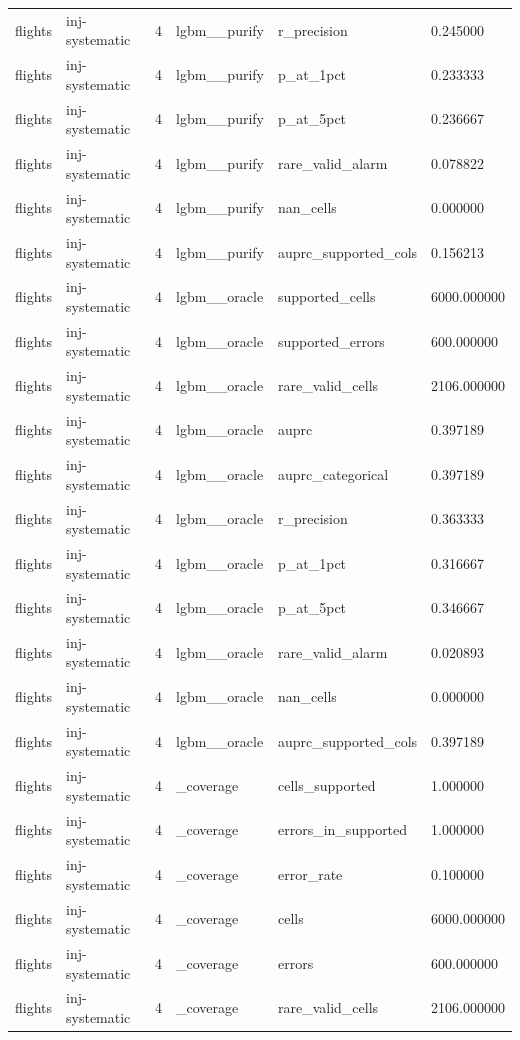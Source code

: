 \begin{tabular}{llllll}
flights & inj-systematic & 4 & lgbm\_\_purify & r\_precision & 0.245000 \\
flights & inj-systematic & 4 & lgbm\_\_purify & p\_at\_1pct & 0.233333 \\
flights & inj-systematic & 4 & lgbm\_\_purify & p\_at\_5pct & 0.236667 \\
flights & inj-systematic & 4 & lgbm\_\_purify & rare\_valid\_alarm & 0.078822 \\
flights & inj-systematic & 4 & lgbm\_\_purify & nan\_cells & 0.000000 \\
flights & inj-systematic & 4 & lgbm\_\_purify & auprc\_supported\_cols & 0.156213 \\
flights & inj-systematic & 4 & lgbm\_\_oracle & supported\_cells & 6000.000000 \\
flights & inj-systematic & 4 & lgbm\_\_oracle & supported\_errors & 600.000000 \\
flights & inj-systematic & 4 & lgbm\_\_oracle & rare\_valid\_cells & 2106.000000 \\
flights & inj-systematic & 4 & lgbm\_\_oracle & auprc & 0.397189 \\
flights & inj-systematic & 4 & lgbm\_\_oracle & auprc\_categorical & 0.397189 \\
flights & inj-systematic & 4 & lgbm\_\_oracle & r\_precision & 0.363333 \\
flights & inj-systematic & 4 & lgbm\_\_oracle & p\_at\_1pct & 0.316667 \\
flights & inj-systematic & 4 & lgbm\_\_oracle & p\_at\_5pct & 0.346667 \\
flights & inj-systematic & 4 & lgbm\_\_oracle & rare\_valid\_alarm & 0.020893 \\
flights & inj-systematic & 4 & lgbm\_\_oracle & nan\_cells & 0.000000 \\
flights & inj-systematic & 4 & lgbm\_\_oracle & auprc\_supported\_cols & 0.397189 \\
flights & inj-systematic & 4 & \_coverage & cells\_supported & 1.000000 \\
flights & inj-systematic & 4 & \_coverage & errors\_in\_supported & 1.000000 \\
flights & inj-systematic & 4 & \_coverage & error\_rate & 0.100000 \\
flights & inj-systematic & 4 & \_coverage & cells & 6000.000000 \\
flights & inj-systematic & 4 & \_coverage & errors & 600.000000 \\
flights & inj-systematic & 4 & \_coverage & rare\_valid\_cells & 2106.000000 \\

\end{tabular}
